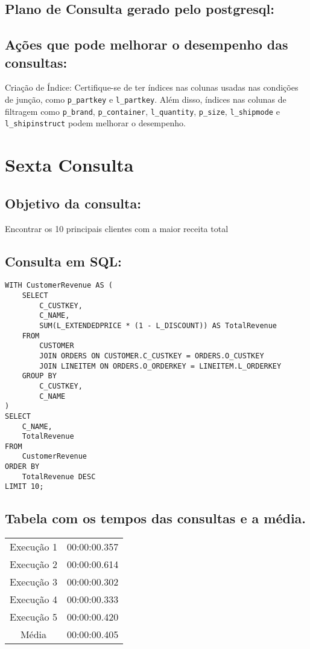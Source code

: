 \documentclass[12pt]{article}
\begin{document}
\begin{landscape}
\subsection{Plano de Consulta gerado pelo postgresql:}

\subsection{Ações que pode melhorar o desempenho das 
consultas:} Criação de Índice: Certifique-se de ter índices nas colunas usadas nas condições de junção, como \texttt{p\_partkey} e \texttt{l\_partkey}. Além disso, índices nas colunas de filtragem como \texttt{p\_brand}, \texttt{p\_container}, \texttt{l\_quantity}, \texttt{p\_size}, \texttt{l\_shipmode} e \texttt{l\_shipinstruct} podem melhorar o desempenho.

\section{Sexta Consulta}


\subsection{Objetivo da consulta:}
Encontrar os 10 principais clientes com a maior receita total

\subsection{Consulta em SQL:}
\begin{lstlisting}
WITH CustomerRevenue AS (
    SELECT
        C_CUSTKEY,
        C_NAME,
        SUM(L_EXTENDEDPRICE * (1 - L_DISCOUNT)) AS TotalRevenue
    FROM
        CUSTOMER
        JOIN ORDERS ON CUSTOMER.C_CUSTKEY = ORDERS.O_CUSTKEY
        JOIN LINEITEM ON ORDERS.O_ORDERKEY = LINEITEM.L_ORDERKEY
    GROUP BY
        C_CUSTKEY,
        C_NAME
)
SELECT
    C_NAME,
    TotalRevenue
FROM
    CustomerRevenue
ORDER BY
    TotalRevenue DESC
LIMIT 10;
\end{lstlisting}

\subsection{Tabela com os tempos das consultas e a média.}
\begin{tabular}{|c|c|}
  \hline
  Execução 1 & 00:00:00.357 \\
  Execução 2 & 00:00:00.614 \\
  Execução 3 & 00:00:00.302 \\
  Execução 4 & 00:00:00.333 \\
  Execução 5 & 00:00:00.420 \\
  \hline
  Média & 00:00:00.405 \\
  \hline
\end{tabular}


\end{landscape}
\end{document}
